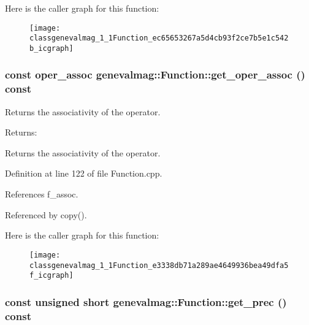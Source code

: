 Here is the caller graph for this function:\nopagebreak
\begin{figure}[H]
\begin{center}
\leavevmode
\texttt{[image: classgenevalmag\_1\_1Function\_ec65653267a5d4cb93f2ce7b5e1c542b\_icgraph]}
\end{center}
\end{figure}
\hypertarget{classgenevalmag_1_1Function_e3338db71a289ae4649936bea49dfa5f}{
\subsubsection[{get\_\-oper\_\-assoc}]{\setlength{\rightskip}{0pt plus 5cm}const {\bf oper\_\-assoc} genevalmag::Function::get\_\-oper\_\-assoc () const}}
\label{classgenevalmag_1_1Function_e3338db71a289ae4649936bea49dfa5f}


Returns the associativity of the operator. \begin{Desc}
\item[Returns:]\end{Desc}
Returns the associativity of the operator. 

Definition at line 122 of file Function.cpp.

References f\_\-assoc.

Referenced by copy().

Here is the caller graph for this function:\nopagebreak
\begin{figure}[H]
\begin{center}
\leavevmode
\texttt{[image: classgenevalmag\_1\_1Function\_e3338db71a289ae4649936bea49dfa5f\_icgraph]}
\end{center}
\end{figure}
\hypertarget{classgenevalmag_1_1Function_31272821c5ad532ada3b3d8a988f5891}{
\subsubsection[{get\_\-prec}]{\setlength{\rightskip}{0pt plus 5cm}const unsigned short genevalmag::Function::get\_\-prec () const}}
\label{classgenevalmag_1_1Function_31272821c5ad532ada3b3d8a988f5891}


